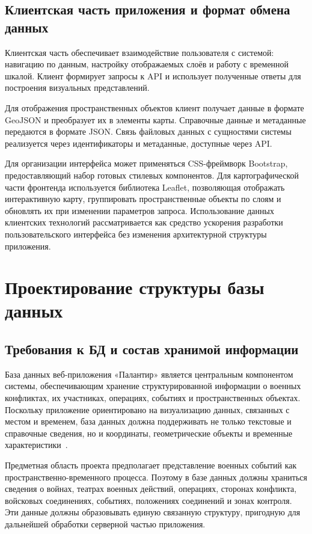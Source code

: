 \subsection{Клиентская часть приложения и формат обмена данных}

Клиентская часть обеспечивает взаимодействие пользователя с системой: навигацию по данным, настройку отображаемых слоёв и работу с временной шкалой. Клиент формирует запросы к API и использует полученные ответы для построения визуальных представлений.

Для отображения пространственных объектов клиент получает данные в формате GeoJSON и преобразует их в элементы карты. Справочные данные и метаданные передаются в формате JSON. Связь файловых данных с сущностями системы реализуется через идентификаторы и метаданные, доступные через API.

Для организации интерфейса может применяться CSS-фреймворк Bootstrap, предоставляющий набор готовых стилевых компонентов. Для картографической части фронтенда используется библиотека Leaflet, позволяющая отображать интерактивную карту, группировать пространственные объекты по слоям и обновлять их при изменении параметров запроса. Использование данных клиентских технологий рассматривается как средство ускорения разработки пользовательского интерфейса без изменения архитектурной структуры приложения.

\section{Проектирование структуры базы данных}

\subsection{Требования к БД и состав хранимой информации}

База данных веб-приложения «Палантир» является центральным компонентом системы, обеспечивающим хранение структурированной информации о военных конфликтах, их участниках, операциях, событиях и пространственных объектах. Поскольку приложение ориентировано на визуализацию данных, связанных с местом и временем, база данных должна поддерживать не только текстовые и справочные сведения, но и координаты, геометрические объекты и временные характеристики~\cite{silberschatz2019database}.

Предметная область проекта предполагает представление военных событий как пространственно-временного процесса. Поэтому в базе данных должны храниться сведения о войнах, театрах военных действий, операциях, сторонах конфликта, войсковых соединениях, событиях, положениях соединений и зонах контроля. Эти данные должны образовывать единую связанную структуру, пригодную для дальнейшей обработки серверной частью приложения.

